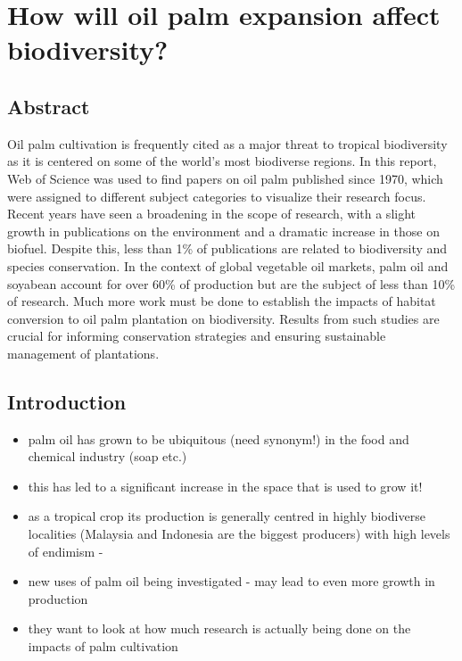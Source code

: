 \section*{How will oil palm expansion affect biodiversity? \cite{Fitzherbert2008}}

\subsection*{Abstract}
Oil palm cultivation is frequently cited as a major threat to tropical biodiversity as it is centered on some of the world's most biodiverse regions. In this report, Web of Science was used to find papers on oil palm published since 1970, which were assigned to different subject categories to visualize their research focus. Recent years have seen a broadening in the scope of research, with a slight growth in publications on the environment and a dramatic increase in those on biofuel. Despite this, less than 1\% of publications are related to biodiversity and species conservation. In the context of global vegetable oil markets, palm oil and soyabean account for over 60\% of production but are the subject of less than 10\% of research. Much more work must be done to establish the impacts of habitat conversion to oil palm plantation on biodiversity. Results from such studies are crucial for informing conservation strategies and ensuring sustainable management of plantations.

\subsection*{Introduction}
\begin{itemize}
	\item palm oil has grown to be ubiquitous (need synonym!) in the food and chemical industry (soap etc.) 
	\item this has led to a significant increase in the space that is used to grow it!
	\item as a tropical crop its production is generally centred in highly biodiverse localities (Malaysia and Indonesia are the biggest producers)  with high levels of endimism - \citep{Basiron2007}
	\item new uses of palm oil being investigated - may lead to even more growth in production
	\item they want to look at how much research is actually being done on the impacts of palm cultivation
\end{itemize}

